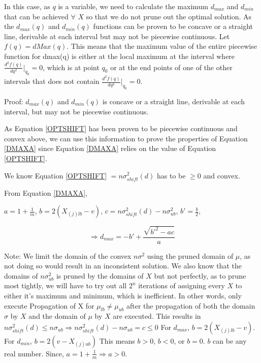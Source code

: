 \documentclass[a4paper,12pt]{article}
\begin{document}
In this case, as $q$ is a variable, we need to calculate the maximum $d_{max}$ and  $d_{min}$ that can be achieved $\forall$ $X$ so that we do not prune out the optimal solution. As the $d_{max}(q)$ and $d_{min}(q)$ functions can be proven to be concave or a straight line, derivable at each interval but may not be piecewise continuous. Let $f(q) = dMax(q)$. This means that the maximum value of the entire piecewise function for dmax(q) is either at the local maximum at the interval where $\frac{d^2f(q)}{dq^2} |_{q_{0}} = 0$, which is at point $q_{0}$ or at the end points of one of the other intervals that does not contain $\frac{d^2f(q)}{dq^2} |_{q_{0}} = 0$. 

Proof: $d_{max}(q)$ and $d_{min}(q)$ is concave or a straight line, derivable at each interval, but may not be piecewise continuous. 

As Equation \ref{OPTSHIFT} has been proven to be piecewise continuous and convex above, we can use this information to prove the properties of Equation \ref{DMAXA} since Equation \ref{DMAXA} relies on the value of Equation \ref{OPTSHIFT}. 

We know Equation \ref{OPTSHIFT} $= n\sigma^2_{shift}(d)$ has to be $\geq 0$ and convex. 

From Equation \ref{DMAXA}, 

$a = 1+\frac{1}{m}$, $b=2(X_{(j)lb}-v)$, $c=n\sigma^2_{shift}(d)- n \sigma_{ub}^2$, $b'=\frac{b}{2}$, 

$$ \Rightarrow d_{max}= -b' + \frac{\sqrt{b'^2-ac}}{a}$$

Note: We limit the domain of the convex $n\sigma^2$ using the pruned domain of $\mu$, as not doing so would result in an inconsistent solution. We also know that the domains of $n \sigma_{ub}^2$ is pruned by the domains of $X$ but not perfectly, as to prune most tightly, we will have to try out all $2^n$ iterations of assigning every $X$ to either it's maximum and minimum, which is inefficient. In other words, only execute Propagation of X for $\mu_{lb}\neq\mu_{ub}$ after the propagation of both the domain $\sigma$ by $X$ and the domain of $\mu$ by $X$ are executed. This results in $n\sigma^2_{shift}(d)\leq n \sigma_{ub} \Rightarrow n\sigma^2_{shift}(d)- n \sigma_{ub}= c \leq 0$
For $d_{max}$, $b=2(X_{(j)lb}-v)$. 
For $d_{min}$, $b=2(v - X_{(j)ub})$
This means $b>0$, $b<0$, or $b=0$. $b$ can be any real number. 
Since, $a = 1+\frac{1}{m} \Rightarrow a > 0$.
\end{document}
